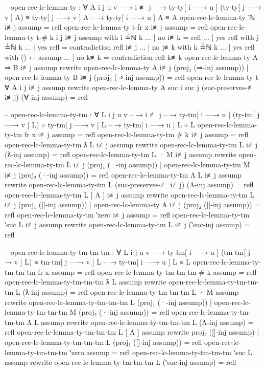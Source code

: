\documentclass[logo,bsc,singlespacing,parskip,online]{infthesis}
\begin{document}
\begin{code}
  -- open-rec-lc-lemma-ty : ∀ {A i j u v}
  --   → i ≢ j
  --   → ty-ty[ i —→ u ] (ty-ty[ j —→ v ] A) ≡ ty-ty[ j —→ v ] A
  --   → ty-ty[ i —→ u ] A ≡ A
  open-rec-lc-lemma-ty {‵ℕ} i≢j assump = refl
  open-rec-lc-lemma-ty {t-fr x} i≢j assump = refl
  open-rec-lc-lemma-ty {t-# k} {i} {j} i≢j assump with i ≟ℕ k
  ... | no  i≢k  = refl
  ... | yes refl with j ≟ℕ k
  ...   | yes refl = contradiction refl i≢j
  ...   | no  j≢k with k ≟ℕ k
  ...     | yes refl with () ← assump
  ...     | no  k≢k = contradiction refl k≢k
  open-rec-lc-lemma-ty {A ⇒ B} i≢j assump rewrite
      open-rec-lc-lemma-ty {A} i≢j (proj₁ (⇒-inj assump))
    | open-rec-lc-lemma-ty {B} i≢j (proj₂ (⇒-inj assump))
    = refl
  open-rec-lc-lemma-ty {t-∀ A} {i} {j} i≢j assump
    rewrite open-rec-lc-lemma-ty {A} {suc i} {suc j}
      (suc-preserves-≢ i≢j)
      (∀-inj assump)
        = refl

  -- open-rec-lc-lemma-ty-tm : ∀ {L i j u v}
  --   → i ≢ j
  --   → ty-tm[ i —→ u ] (ty-tm[ j —→ v ] L) ≡ ty-tm[ j —→ v ] L
  --   → ty-tm[ i —→ u ] L ≡ L
  open-rec-lc-lemma-ty-tm {fr x} i≢j assump = refl
  open-rec-lc-lemma-ty-tm {# k} i≢j assump = refl
  open-rec-lc-lemma-ty-tm {ƛ L} i≢j assump rewrite
    open-rec-lc-lemma-ty-tm {L} i≢j (ƛ-inj assump) = refl
  open-rec-lc-lemma-ty-tm {L · M} i≢j assump rewrite
      open-rec-lc-lemma-ty-tm {L} i≢j (proj₁ (·-inj assump))
    | open-rec-lc-lemma-ty-tm {M} i≢j (proj₂ (·-inj assump)) = refl
  open-rec-lc-lemma-ty-tm {Λ L} i≢j assump rewrite
    open-rec-lc-lemma-ty-tm {L} (suc-preserves-≢ i≢j) (Λ-inj assump) = refl
  open-rec-lc-lemma-ty-tm {L [ A ]} i≢j assump rewrite
      open-rec-lc-lemma-ty-tm {L} i≢j (proj₁ ([]-inj assump))
    | open-rec-lc-lemma-ty {A} i≢j (proj₂ ([]-inj assump)) = refl
  open-rec-lc-lemma-ty-tm {‵zero} i≢j assump = refl
  open-rec-lc-lemma-ty-tm {‵suc L} i≢j assump rewrite
    open-rec-lc-lemma-ty-tm {L} i≢j (‵suc-inj assump) = refl

  -- open-rec-lc-lemma-ty-tm-tm-tm : ∀ {L i j u v}
  --   → ty-tm[ i —→ u ] (tm-tm[ j —→ v ] L) ≡ tm-tm[ j —→ v ] L
  --   → ty-tm[ i —→ u ] L ≡ L
  open-rec-lc-lemma-ty-tm-tm-tm {fr x} assump = refl
  open-rec-lc-lemma-ty-tm-tm-tm {# k} assump = refl
  open-rec-lc-lemma-ty-tm-tm-tm {ƛ L} assump rewrite
    open-rec-lc-lemma-ty-tm-tm-tm {L} (ƛ-inj assump) = refl
  open-rec-lc-lemma-ty-tm-tm-tm {L · M} assump rewrite
      open-rec-lc-lemma-ty-tm-tm-tm {L} (proj₁ (·-inj assump))
    | open-rec-lc-lemma-ty-tm-tm-tm {M} (proj₂ (·-inj assump))
    = refl
  open-rec-lc-lemma-ty-tm-tm-tm {Λ L} assump rewrite
    open-rec-lc-lemma-ty-tm-tm-tm {L} (Λ-inj assump) = refl
  open-rec-lc-lemma-ty-tm-tm-tm {L [ A ]} assump rewrite
      proj₂ ([]-inj assump)
    | open-rec-lc-lemma-ty-tm-tm-tm {L} (proj₁ ([]-inj assump))
    = refl
  open-rec-lc-lemma-ty-tm-tm-tm {‵zero} assump = refl
  open-rec-lc-lemma-ty-tm-tm-tm {‵suc L} assump rewrite
    open-rec-lc-lemma-ty-tm-tm-tm {L} (‵suc-inj assump) = refl
\end{code}
\end{document}
